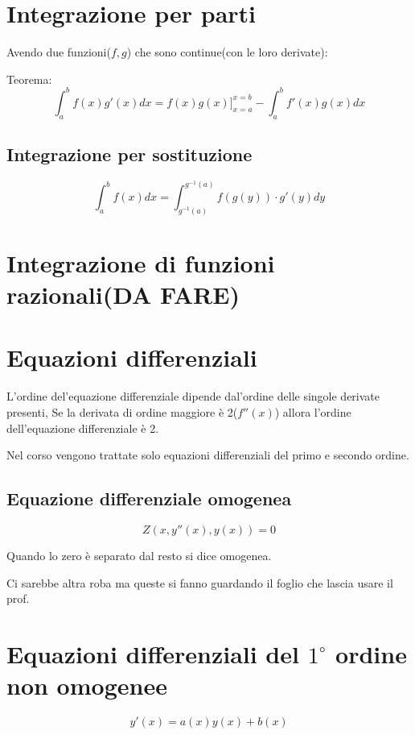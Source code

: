 \documentclass{article}
\begin{document}
    \section{Integrazione per parti}
    \setcounter{equation}{0}

    Avendo due funzioni($f, g$) che sono continue(con le loro derivate):

    Teorema:
    \begin{equation}
        \int_a^b f(x)g'(x)dx = f(x)g(x)\Bigg]_{x=a}^{x=b}- \int_a^b f'(x)g(x)dx
    \end{equation}

    \subsection{Integrazione per sostituzione}
    \setcounter{equation}{0}

    \begin{equation}
        \int_a^b f(x)dx = \int_{g^{-1}(a)}^{g^{-1}(a)}f(g(y)) \cdot g'(y)dy
    \end{equation}




    \section{Integrazione di funzioni razionali(DA FARE)}

    \section{Equazioni differenziali}
    L'ordine del'equazione differenziale dipende dal'ordine delle singole derivate presenti, 
    Se la derivata di ordine maggiore è 2($f''(x)$) allora l'ordine dell'equazione differenziale è 2.

    Nel corso vengono trattate solo equazioni differenziali del primo e secondo ordine.

    \subsection{Equazione differenziale omogenea}
    \setcounter{equation}{0}
    \begin{equation}
        Z(x, y''(x), y(x)) = 0
    \end{equation}

    Quando lo zero è separato dal resto si dice omogenea.

    Ci sarebbe altra roba ma queste si fanno guardando il foglio che lascia usare il prof.


    \section{Equazioni differenziali del $1^\circ$ ordine non omogenee}
    \begin{equation*}
        y'(x) = a(x) y(x) + b(x)
    \end{equation*}

    
\end{document}
